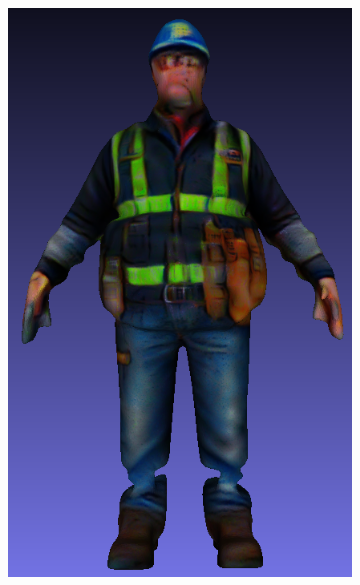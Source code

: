 \begin{figure}[H]
\begin{subfigure}[b]{0.198\textwidth}
        \includegraphics[width=\textwidth]{figures/future/bias_engineer_genie_3.png}
        \caption{}
    \end{subfigure}
    \begin{subfigure}[b]{0.324\textwidth}
        \centering

\end{subfigure}
\end{figure}
